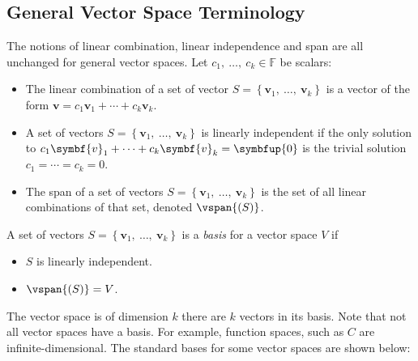\documentclass{article}
\begin{document}
\subsection{General Vector Space Terminology}
The notions of linear combination, linear independence and span are all
unchanged for general vector spaces.
Let \(c_1,\: \dots,\: c_k \in \mathbb{F}\) be scalars:
\begin{itemize}
    \item The linear combination of a set of vector \(S = \left\{
          \symbf{v}_1,\: \dots,\: \symbf{v}_k \right\}\) is a vector of
          the form \(\symbf{v} = c_1 \symbf{v}_1 + \cdots + c_k
          \symbf{v}_k\).
    \item A set of vectors \(S = \left\{ \symbf{v}_1,\: \dots,\:
          \symbf{v}_k \right\}\) is linearly independent if the only
          solution to \(c_1 \symbf{v}_1 + \cdots + c_k \symbf{v}_k =
          \symbfup{0}\) is the trivial solution \(c_1 = \cdots = c_k =
          0\).
    \item The span of a set of vectors \(S = \left\{ \symbf{v}_1,\:
          \dots,\: \symbf{v}_k \right\}\) is the set of all linear
          combinations of that set, denoted \(\vspan{\left( S
          \right)}\).
\end{itemize}
A set of vectors \(S = \left\{ \symbf{v}_1,\: \dots,\: \symbf{v}_k \right\}\) is a \textit{basis} for a vector space \(V\) if
\begin{itemize}
    \item \(S\) is linearly independent.
    \item \(\vspan{\left( S \right)} = V\).
\end{itemize}
The vector space is of dimension \(k\) there are \(k\) vectors in its basis. Note that not all vector spaces have a basis. For example, function spaces, such as \(C\)
are infinite-dimensional.
The standard bases for some vector spaces are shown below:
\end{document}
